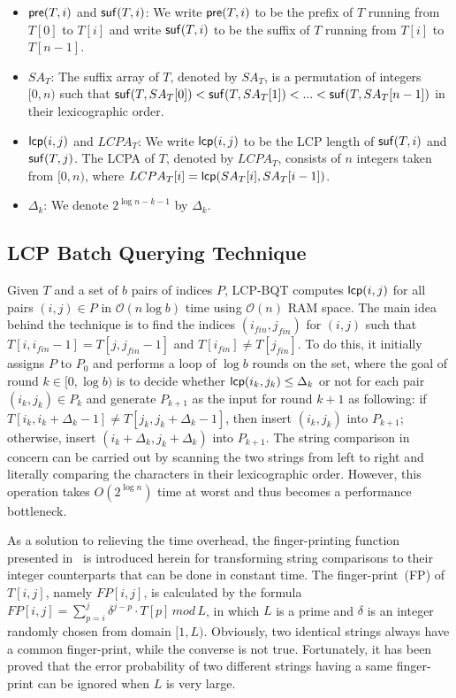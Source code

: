 \documentclass[article]{IEEEtran}
\theoremstyle{definition}
\theoremstyle{remark}
\numberwithin{equation}{section}
\begin{document}
\begin{itemize}
\item ${\sf pre}(T,i)$ and ${\sf suf}(T,i)$: We write ${\sf pre}(T,i)$ to be the prefix of $T$ running from $T[0]$ to $T[i]$ and write ${\sf suf}(T,i)$ to be the suffix of $T$ running from $T[i]$ to $T[n-1]$.
\item  $SA_T$:  The suffix array of $T$, denoted by $SA_T$, is a permutation of integers $[0,n)$ such that ${\sf suf}(T,SA_T[0])<{\sf suf}(T,SA_T[1])<...<{\sf suf}(T,SA_T[n-1])$ in their lexicographic order.
\item ${\sf lcp}(i,j)$ and $LCPA_T$: We write ${\sf lcp}(i,j)$ to be the LCP length of ${\sf suf}(T,i)$ and ${\sf suf}(T,j)$. The LCPA of $T$, denoted by $LCPA_T$, consists of $n$ integers taken from $[0,n)$, where $LCPA_T[i]= {\sf lcp}(SA_T[i],SA_T[i-1])$.
\item $\Delta_{k}$: We denote $2^{\log n - k - 1}$ by $\Delta_{k}$.
\end{itemize}

\subsection{LCP Batch Querying Technique}\label{subsec:lcp_batch_querying_technique}

Given $T$ and a set of $b$ pairs of indices $P$, LCP-BQT computes ${\sf lcp}(i,j)$ for all pairs $(i,j)\in P$ in $\mathcal{O}(n\log b)$ time using $\mathcal{O}(n)$ RAM space. The main idea behind the technique is to find the indices $(i_{fin}, j_{fin})$ for $(i,j)$ such that $T[i,i_{fin}-1]=T[j,j_{fin}-1]$ and $T[i_{fin}] \neq T[j_{fin}]$. To do this, it initially assigns $P$ to $P_0$ and performs a loop of $\log b$ rounds on the set, where the goal of round $k\in [0,\log b)$ is to decide whether ${\sf lcp}(i_k,j_k) \le \Delta_k$ or not for each pair $(i_k,j_k)\in P_k$ and generate $P_{k+1}$ as the input for round $k+1$ as following: if $T[i_k,i_k+\Delta_k-1] \neq T[j_k,j_k+\Delta_k-1]$, then insert $(i_k,j_k)$ into $P_{k+1}$; otherwise, insert $(i_k+\Delta_k,j_k+\Delta_k)$ into $P_{k+1}$. The string comparison in concern can be carried out by scanning the two strings from left to right and literally comparing the characters in their lexicographic order. However, this operation takes $O(2^{\log n})$ time at worst and thus becomes a performance bottleneck.

As a solution to relieving the time overhead, the finger-printing function presented in~\cite{Karp1987} is introduced herein for transforming string comparisons to their integer counterparts that can be done in constant time. The finger-print~(FP) of $T[i,j]$, namely $FP[i,j]$, is calculated by the formula $FP[i,j] = \sum_{p=i}^{j} \delta^{j-p} \cdot T[p] \, mod \, L$, in which $L$ is a prime and $\delta$ is an integer randomly chosen from domain $[1,L)$. Obviously, two identical strings always have a common finger-print, while the converse is not true. Fortunately, it has been proved that the error probability of two different strings having a same finger-print can be ignored when $L$ is very large.
\end{document}
